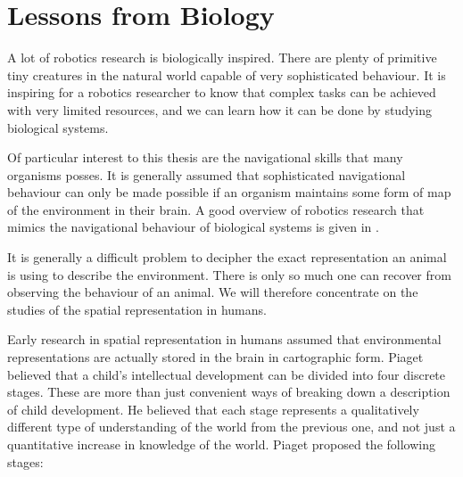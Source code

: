 
\section{Lessons from Biology}

A lot of robotics research is biologically inspired. There are plenty
of primitive tiny creatures in the natural world capable of
very sophisticated behaviour. It is inspiring for a robotics
researcher to know that complex tasks can be achieved with very
limited resources, and we can learn how it can be done by studying
biological systems.

Of particular interest to this thesis are the navigational skills that
many organisms posses. It is generally assumed that sophisticated
navigational behaviour can only be made possible if an organism
maintains some form of map of the environment in their brain.  A good
overview of robotics research that mimics the navigational behaviour
of biological systems is given in \cite{bio_franz00}.

It is generally a difficult problem to decipher the exact
representation an animal is using to describe the environment. There
is only so much one can recover from observing the behaviour of an
animal. We will therefore concentrate on the studies of the spatial
representation in humans.

Early research in spatial representation in humans
\cite{psycho_piaget56} assumed that environmental representations are
actually stored in the brain in cartographic form.  Piaget believed
that a child's intellectual development can be divided into four
discrete stages. These are more than just convenient ways of breaking
down a description of child development. He believed that each stage
represents a qualitatively different type of understanding of the
world from the previous one, and not just a quantitative increase in
knowledge of the world. Piaget proposed the following stages:

